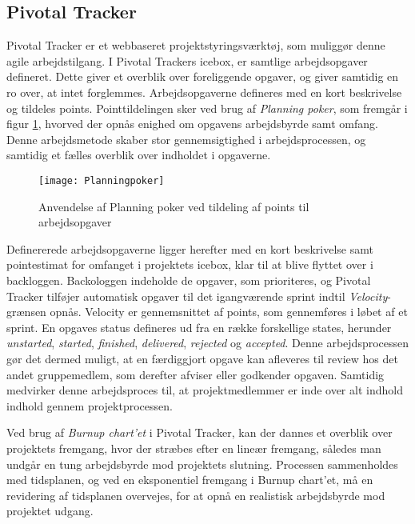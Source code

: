 	\subsection{Pivotal Tracker}
	\label{subsec:pivotal}
	Pivotal Tracker er et webbaseret projektstyringsværktøj, som muliggør denne agile arbejdstilgang. I Pivotal Trackers icebox, er samtlige arbejdsopgaver defineret. Dette giver et overblik over foreliggende opgaver, og giver samtidig en ro over, at intet forglemmes. Arbejdsopgaverne defineres med en kort beskrivelse og tildeles points. Pointtildelingen sker ved brug af \textit{Planning poker}, som fremgår i figur \ref{fig:planningpoker}, hvorved der opnås enighed om opgavens arbejdsbyrde samt omfang. Denne arbejdsmetode skaber stor gennemsigtighed i arbejdsprocessen, og samtidig et fælles overblik over indholdet i opgaverne. 
	
	\begin{figure}[htb]
	\centering
	\texttt{[image: Planningpoker]}
	\caption{Anvendelse af Planning poker ved tildeling af points til arbejdsopgaver}
	\label{fig:planningpoker}	
	\end{figure}
	 
	Definererede arbejdsopgaverne ligger herefter med en kort beskrivelse samt pointestimat for omfanget i projektets icebox, klar til at blive flyttet over i backloggen. Backologgen indeholde de opgaver, som prioriteres, og Pivotal Tracker tilføjer automatisk opgaver til det igangværende sprint indtil \textit{Velocity}-grænsen opnås. Velocity er gennemsnittet af points, som gennemføres i løbet af et sprint. En opgaves status defineres ud fra en række forskellige states, herunder \textit{unstarted}, \textit{started}, \textit{finished}, \textit{delivered}, \textit{rejected} og \textit{accepted}. Denne arbejdsprocessen gør det dermed muligt, at en færdiggjort opgave kan afleveres til review hos det andet gruppemedlem, som derefter afviser eller godkender opgaven. Samtidig medvirker denne arbejdsproces til, at projektmedlemmer er inde over alt indhold indhold gennem projektprocessen.     
	
	Ved brug af \textit{Burnup chart'et} i Pivotal Tracker, kan der dannes et overblik over projektets fremgang, hvor der stræbes efter en lineær fremgang, således man undgår en tung arbejdsbyrde mod projektets slutning. Processen sammenholdes med tidsplanen, og ved en eksponentiel fremgang i Burnup chart'et, må en revidering af tidsplanen overvejes, for at opnå en realistisk arbejdsbyrde mod projektet udgang.  
	
